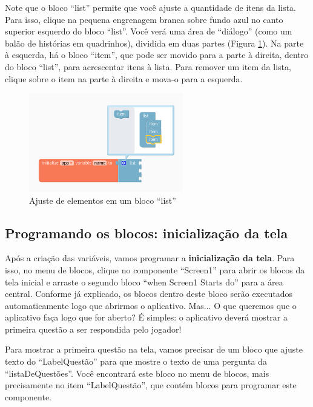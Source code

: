 \documentclass[11pt,fleqn]{book} %
\begin{document}
Note que o bloco ``list'' permite que você ajuste a quantidade de itens da lista. Para isso, clique na pequena engrenagem branca sobre fundo azul no canto superior esquerdo do bloco ``list''. Você verá uma área de ``diálogo'' (como um balão de histórias em quadrinhos), dividida em duas partes (Figura \ref{fig:extraquizlist}). Na parte à esquerda, há o bloco ``item'', que pode ser movido para a parte à direita, dentro do bloco ``list'', para acrescentar itens à lista. Para remover um item da lista, clique sobre o item na parte à direita e mova-o para a esquerda.

\begin{figure}[H]
	\centering
    \includegraphics[width=0.6\textwidth]{Pictures/GuiaThunkExtraQuizList.png}
    \caption{Ajuste de elementos em um bloco ``list''}\label{fig:extraquizlist}
\end{figure}


\subsection{Programando os blocos: inicialização da tela}

Após a criação das variáveis, vamos programar a \textbf{inicialização da tela}. Para isso, no menu de blocos, clique no componente ``Screen1'' para abrir os blocos da tela inicial e arraste o segundo bloco ``when Screen1 Starts do'' para a área central. Conforme já explicado, os blocos dentro deste bloco serão executados automaticamente logo que abrirmos o aplicativo. Mas... O que queremos que o aplicativo faça logo que for aberto? É simples: o aplicativo deverá mostrar a primeira questão a ser respondida pelo jogador!

Para mostrar a primeira questão na tela, vamos precisar de um bloco que ajuste texto do ``LabelQuestão'' para que mostre o texto de uma pergunta da ``listaDeQuestões''. Você encontrará este bloco no menu de blocos, mais precisamente no item ``LabelQuestão'', que contém blocos para programar este componente. 
\end{document}
